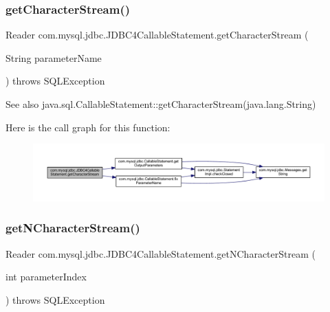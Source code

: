 \subsubsection{\texorpdfstring{get\+Character\+Stream()}{getCharacterStream()}\hspace{0.1cm}{\footnotesize\ttfamily [2/2]}}
{\footnotesize\ttfamily Reader com.\+mysql.\+jdbc.\+J\+D\+B\+C4\+Callable\+Statement.\+get\+Character\+Stream (\begin{DoxyParamCaption}\item[{String}]{parameter\+Name }\end{DoxyParamCaption}) throws S\+Q\+L\+Exception}

\begin{DoxySeeAlso}{See also}
java.\+sql.\+Callable\+Statement\+::get\+Character\+Stream(java.\+lang.\+String) 
\end{DoxySeeAlso}
Here is the call graph for this function\+:
\nopagebreak
\begin{figure}[H]
\begin{center}
\leavevmode
\includegraphics[width=350pt]{classcom_1_1mysql_1_1jdbc_1_1_j_d_b_c4_callable_statement_a15b4e03ffebdf0911e1d94141b6caa9d_cgraph}
\end{center}
\end{figure}
\mbox{\label{classcom_1_1mysql_1_1jdbc_1_1_j_d_b_c4_callable_statement_ab6d3df8d45cf6f39eddc72d68d0b9e58}} 
\subsubsection{\texorpdfstring{get\+N\+Character\+Stream()}{getNCharacterStream()}\hspace{0.1cm}{\footnotesize\ttfamily [1/2]}}
{\footnotesize\ttfamily Reader com.\+mysql.\+jdbc.\+J\+D\+B\+C4\+Callable\+Statement.\+get\+N\+Character\+Stream (\begin{DoxyParamCaption}\item[{int}]{parameter\+Index }\end{DoxyParamCaption}) throws S\+Q\+L\+Exception}


